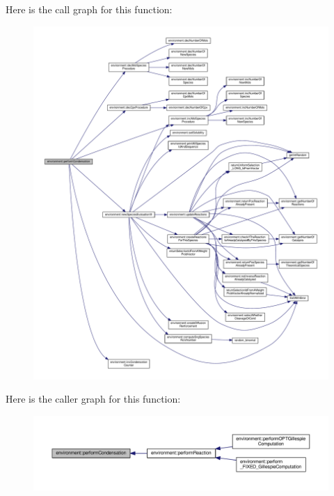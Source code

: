 Here is the call graph for this function\-:\nopagebreak
\begin{figure}[H]
\begin{center}
\leavevmode
\includegraphics[width=350pt]{a00003_a1baf5512b7e0a8fb6f8f890ba9f99cd1_cgraph}
\end{center}
\end{figure}




Here is the caller graph for this function\-:\nopagebreak
\begin{figure}[H]
\begin{center}
\leavevmode
\includegraphics[width=350pt]{a00003_a1baf5512b7e0a8fb6f8f890ba9f99cd1_icgraph}
\end{center}
\end{figure}


